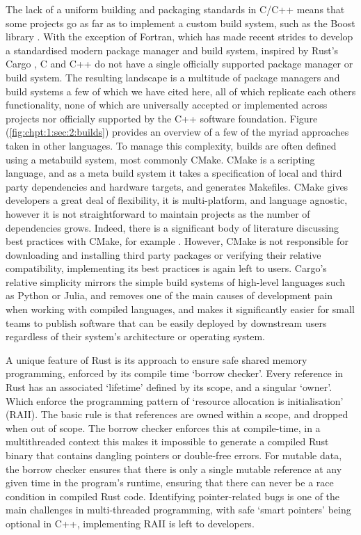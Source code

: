 The lack of a uniform building and packaging standards in C/C++ means that some projects go as far as to implement a custom build system, such as the Boost library \cite{boostbuild2022github}. With the exception of Fortran, which has made recent strides to develop a standardised modern package manager and build system, inspired by Rust's Cargo \cite{fpm2022github}, C and C++ do not have a single officially supported package manager or build system. The resulting landscape is a multitude of package managers \cite{spack2022github, vcpkg2022github, conan2022github} and build systems \cite{meson2022github, bazel2022github, scons2022github} a few of which we have cited here, all of which replicate each others functionality, none of which are universally accepted or implemented across projects nor officially supported by the C++ software foundation. Figure (\ref{fig:chpt:1:sec:2:builds}) provides an overview of a few of the myriad approaches taken in other languages. To manage this complexity, builds are often defined using a metabuild system, most commonly CMake. CMake is a scripting language, and as a meta build system it takes a specification of local and third party dependencies and hardware targets, and generates Makefiles. CMake gives developers a great deal of flexibility, it is multi-platform, and language agnostic, however it is not straightforward to maintain projects as the number of dependencies grows. Indeed, there is a significant body of literature discussing best practices with CMake, for example \cite{scott2018professional}. However, CMake is not responsible for downloading and installing third party packages or verifying their relative compatibility, implementing its best practices is again left to users. Cargo's relative simplicity mirrors the simple build systems of high-level languages such as Python or Julia, and removes one of the main causes of development pain when working with compiled languages, and makes it significantly easier for small teams to publish software that can be easily deployed by downstream users regardless of their system's architecture or operating system.

A unique feature of Rust is its approach to ensure safe shared memory programming, enforced by its compile time `borrow checker'. Every reference in Rust has an associated `lifetime' defined by its scope, and a singular `owner'. Which enforce the programming pattern of `resource allocation is initialisation' (RAII). The basic rule is that references are owned within a scope, and dropped when out of scope. The borrow checker enforces this at compile-time, in a multithreaded context this makes it impossible to generate a compiled Rust binary that contains dangling pointers or double-free errors. For mutable data, the borrow checker ensures that there is only a single mutable reference at any given time in the program's runtime, ensuring that there can never be a race condition in compiled Rust code. Identifying pointer-related bugs is one of the main challenges in multi-threaded programming, with safe `smart pointers' being optional in C++, implementing RAII is left to developers.

